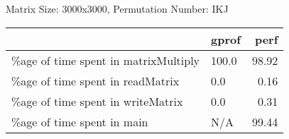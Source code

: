 \documentclass{article}
\begin{document}
    Matrix Size: 3000x3000, Permutation Number: IKJ \\
    \begin{tabular}{llr}
\hline
                                      & gprof   &   perf \\
\hline
 \%age of time spent in matrixMultiply & 100.0   &  98.92 \\
 \%age of time spent in readMatrix     & 0.0     &   0.16 \\
 \%age of time spent in writeMatrix    & 0.0     &   0.31 \\
 \%age of time spent in main           & N/A     &  99.44 \\
\hline
\end{tabular}
    
\end{document}
